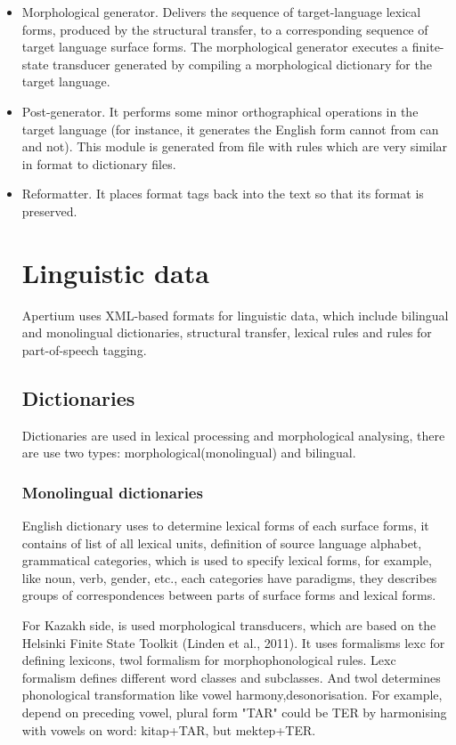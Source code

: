 \documentclass[11pt]{article}
\begin{document}
\begin{itemize}
\item	 Morphological generator. Delivers the sequence of target-language lexical forms, produced by the structural transfer, to a corresponding sequence of target language surface forms. The morphological generator executes a finite-state transducer generated by compiling a morphological dictionary for the target language.     
\item Post-generator. It performs some minor orthographical operations in the target language (for instance, it generates the English form cannot from can and not). This module is generated from file with rules which are very   similar in format to dictionary files. 
\item Reformatter. It places format tags back into the text so that its format is preserved.



\section{Linguistic data}

Apertium uses XML-based formats for linguistic data, which include bilingual and monolingual dictionaries, structural transfer, lexical rules and rules for part-of-speech tagging.

\subsection{Dictionaries}

Dictionaries are used in lexical processing and morphological analysing, there are use two types: morphological(monolingual) and bilingual.

\subsubsection{Monolingual dictionaries}

English dictionary uses to determine lexical forms of each surface forms, it contains of list of all lexical units, definition of source language alphabet, grammatical categories, which is used to specify lexical forms, for example, like noun, verb, gender, etc., each categories have paradigms, they describes groups of correspondences between parts of surface forms and lexical forms. 

For Kazakh side, is used morphological transducers, which are based on the Helsinki
Finite State Toolkit (Linden et al., 2011). It uses formalisms lexc for defining lexicons, twol formalism for morphophonological rules. Lexc formalism defines different word classes and subclasses. And twol determines phonological transformation like vowel harmony,desonorisation. For example, depend on preceding vowel, plural form "TAR" could be TER by harmonising with vowels on word: kitap+TAR, but mektep+TER.


\end{itemize}
\end{document}
